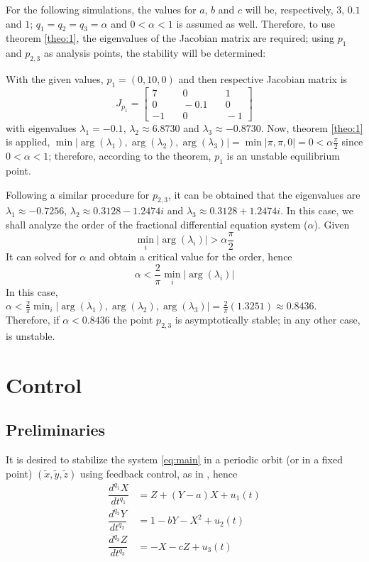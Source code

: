 For the following simulations, the values for $a$, $b$ and $c$ will be, respectively, $3$, $0.1$ and $1$; $q_1=q_2=q_3=\alpha$ and $0<\alpha<1$ is assumed as well. Therefore, to use theorem \ref{theo:1}, the eigenvalues of the Jacobian matrix are required; using $p_1$ and $p_{2,3}$ as analysis points, the stability will be determined:

With the given values, $p_1=(0,10,0)$ and then respective Jacobian matrix is
\begin{equation}
	J_{p_1} = \left[\begin{array}{ccc}
	7 &\quad 0 	&\quad 1\\ 
    0 	&\quad -0.1		&\quad 0\\
    -1 		&\quad 0 	&\quad -1
	\end{array}\right]
\end{equation}
with eigenvalues $\lambda_1=-0.1$, $\lambda_2\approx 6.8730$ and $\lambda_3\approx-0.8730$. Now, theorem \ref{theo:1} is applied, $\min|\arg(\lambda_1),\arg(\lambda_2),\arg(\lambda_3)|=\min|\pi,\pi,0|=0<\alpha\frac{\pi}{2}$ since $0<\alpha<1$; therefore, according to the theorem, $p_1$ is an unstable equilibrium point.

Following a similar procedure for $p_{2,3}$, it can be obtained that the eigenvalues are $\lambda_1\approx-0.7256$, $\lambda_2\approx0.3128-1.2474i$ and $\lambda_3\approx0.3128+1.2474i$. In this case, we shall analyze the order of the fractional differential equation system ($\alpha$). Given \begin{equation*}
	\min_i|\arg(\lambda_i)|>\alpha\frac{\pi}{2}
\end{equation*}
It can solved for $\alpha$ and obtain a critical value for the order, hence
\begin{equation}
	\alpha < \frac{2}{\pi}\min_i|\arg(\lambda_i)|
\end{equation}
In this case, $\alpha <\frac{2}{\pi}\min_i|\arg(\lambda_1),\arg(\lambda_2),\arg(\lambda_3)| = \frac{2}{\pi}(1.3251)\approx0.8436$. Therefore, if $\alpha<0.8436$ the point $p_{2,3}$ is asymptotically stable; in any other case, is unstable.



\section{Control}
\subsection{Preliminaries}
It is desired to stabilize the system \ref{eq:main} in a periodic orbit (or in a fixed point) $\left(\tilde{x},\tilde{y},\tilde{z}\right)$ using feedback control, as in \cite{abd2010chaos}, hence
\begin{equation}
\begin{array}{ll}
\dfrac{d^{q_1}X}{dt^{q_1}}&=Z+(Y-a)X+u_1(t)\\
\dfrac{d^{q_2}Y}{dt^{q_2}}&=1-bY-X^2+u_2(t)\\
\dfrac{d^{q_3}Z}{dt^{q_3}}&=-X-cZ+u_3(t)\\
\end{array}
\end{equation}

